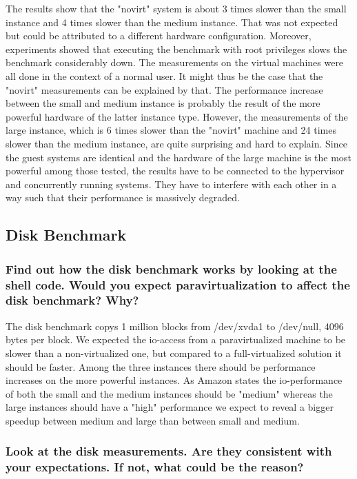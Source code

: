 \documentclass{article}
\begin{document}
The results show that the "novirt" system is about 3 times slower than the small instance and 4 times slower than the medium instance. That was not expected but could be attributed to a different hardware configuration. Moreover, experiments showed that executing the benchmark with root privileges slows the benchmark considerably down. The measurements on the virtual machines were all done in the context of a normal user. It might thus be the case that the "novirt" measurements can be explained by that. The performance increase between the small and medium instance is probably the result of the more powerful hardware of the latter instance type.
However, the measurements of the large instance, which is 6 times slower than the "novirt" machine and 24 times slower than the medium instance, are quite surprising and hard to explain. Since the guest systems are identical and the hardware of the large machine is the most powerful among those tested, the results have to be connected to the hypervisor and concurrently running systems. They have to interfere with each other in a way such that their performance is massively degraded.

\subsection{Disk Benchmark}
	\subsubsection{Find out how the disk benchmark works by looking at the shell code. Would you expect paravirtualization to affect the disk benchmark? Why?}

The disk benchmark copys 1 million blocks from /dev/xvda1 to /dev/null, 4096 bytes per block. We expected the io-access from a paravirtualized machine to be slower than a non-virtualized one, but compared to a full-virtualized solution it should be faster. Among the three instances there should be performance increases on the more powerful instances. As Amazon states the io-performance of both the small and the medium instances should be "medium" whereas the large instances should have a "high" performance we expect to reveal a bigger speedup between medium and large than between small and medium.

	\subsubsection{Look at the disk measurements. Are they consistent with your expectations. If not, what could be the reason?}
\end{document}
